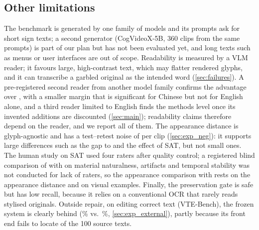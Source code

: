 \subsection{Other limitations}
The benchmark is generated by one family of models and its prompts ask for short sign texts; a second generator (CogVideoX-5B, 360 clips from the same prompts) is part of our plan but has not been evaluated yet, and long texts such as menus or user interfaces are out of scope. Readability is measured by a VLM reader; it favours large, high-contrast text, which may flatter rendered glyphs, and it can transcribe a garbled original as the intended word (\cref{sec:failures}). A pre-registered second reader from another model family confirms the advantage over \steer, with a smaller margin that is significant for Chinese but not for English alone, and a third reader limited to English finds the methods level once its invented additions are discounted (\cref{sec:main}); readability claims therefore depend on the reader, and we report all of them. The appearance distance is glyph-agnostic and has a test--retest noise of \rRetestSD{} per clip (\cref{sec:exp_neg}): it supports large differences such as the gap to \steer and the effect of SAT, but not small ones. The human study on SAT used four raters after quality control; a registered blind comparison of \method with \steer on material naturalness, artifacts and temporal stability was not conducted for lack of raters, so the appearance comparison with \steer rests on the appearance distance and on visual examples. Finally, the preservation gate is safe but has low recall, because it relies on a conventional OCR that rarely reads stylised originals. Outside repair, on editing correct text (VTE-Bench), the frozen system is clearly behind \steer (\xVteOurs\% vs.\ \xVteSteer\%, \cref{sec:exp_external}), partly because its front end fails to locate \xVteFails{} of the 100 source texts.
